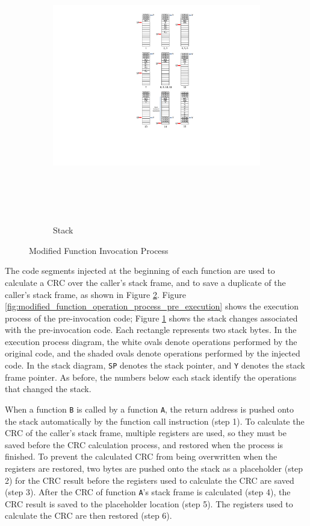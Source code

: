 \begin{figure}[h]
\begin{subfigure}[b]{0.6\columnwidth}
		\includegraphics[width=\textwidth, height=12cm]{figures/modified_function_operations_stack_pre_execution_v2}
		\caption{Stack}
		\label{fig:modified_function_operation_stack_pre_execution}
	\end{subfigure}
	\caption{Modified Function Invocation Process}\label{fig:modified_function_operation_pre_execution}
\end{figure}
The code segments injected at the beginning of each function are used to calculate a CRC over the caller's stack frame, and to save a duplicate of the caller's stack frame, as shown in Figure \ref{fig:modified_function_operation_pre_execution}. Figure \ref{fig:modified_function_operation_process_pre_execution} shows the execution process of the pre-invocation code; Figure \ref{fig:modified_function_operation_stack_pre_execution} shows the stack changes associated with the pre-invocation code. Each rectangle represents two stack bytes. In the execution process diagram, the white ovals denote operations performed by the original code, and the shaded ovals denote operations performed by the injected code. In the stack diagram, \texttt{SP} denotes the stack pointer, and \texttt{Y} denotes the stack frame pointer. As before, the numbers below each stack identify the operations that changed the stack.

When a function \texttt{B} is called by a function \texttt{A}, the return address is pushed onto the stack automatically by the function call instruction (step 1). To calculate the CRC of the caller's stack frame, multiple registers are used, so they must be saved before the CRC calculation process, and restored when the process is finished. To prevent the calculated CRC from being overwritten when the registers are restored, two bytes are pushed onto the stack as a placeholder (step 2) for the CRC result before the registers used to calculate the CRC are saved (step 3). After the CRC of function \texttt{A}'s stack frame is calculated (step 4), the CRC result is saved to the placeholder location (step 5). The registers used to calculate the CRC are then restored (step 6).

